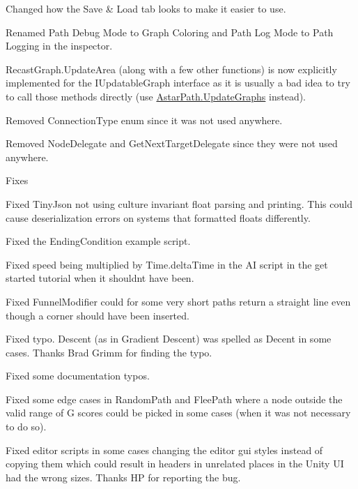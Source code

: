 \begin{DoxyItemize}
\begin{DoxyItemize}
\begin{DoxyItemize}
\item Changed how the \textquotesingle{}Save \& Load\textquotesingle{} tab looks to make it easier to use.
\item Renamed \textquotesingle{}Path Debug Mode\textquotesingle{} to \textquotesingle{}Graph Coloring\textquotesingle{} and \textquotesingle{}Path Log Mode\textquotesingle{} to \textquotesingle{}Path Logging\textquotesingle{} in the inspector.
\item Recast\+Graph.\+Update\+Area (along with a few other functions) is now explicitly implemented for the I\+Updatable\+Graph interface as it is usually a bad idea to try to call those methods directly (use \mbox{\hyperlink{class_astar_path_a6d6ca9490291366e24cde5ef10d23c30}{Astar\+Path.\+Update\+Graphs}} instead).
\item Removed Connection\+Type enum since it was not used anywhere.
\item Removed Node\+Delegate and Get\+Next\+Target\+Delegate since they were not used anywhere.
\end{DoxyItemize}
\item Fixes
\begin{DoxyItemize}
\item Fixed Tiny\+Json not using culture invariant float parsing and printing. This could cause deserialization errors on systems that formatted floats differently.
\item Fixed the Ending\+Condition example script.
\item Fixed speed being multiplied by Time.\+delta\+Time in the AI script in the get started tutorial when it shouldn\textquotesingle{}t have been.
\item Fixed Funnel\+Modifier could for some very short paths return a straight line even though a corner should have been inserted.
\item Fixed typo. \textquotesingle{}Descent\textquotesingle{} (as in \textquotesingle{}Gradient Descent\textquotesingle{}) was spelled as \textquotesingle{}Decent\textquotesingle{} in some cases. Thanks Brad Grimm for finding the typo.
\item Fixed some documentation typos.
\item Fixed some edge cases in Random\+Path and Flee\+Path where a node outside the valid range of G scores could be picked in some cases (when it was not necessary to do so).
\item Fixed editor scripts in some cases changing the editor gui styles instead of copying them which could result in headers in unrelated places in the Unity UI had the wrong sizes. Thanks HP for reporting the bug.

\end{DoxyItemize}
\end{DoxyItemize}
\end{DoxyItemize}
